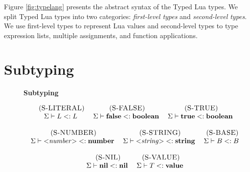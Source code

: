 Figure \ref{fig:typelang} presents the abstract syntax of the
Typed Lua types.
We split Typed Lua types into two categories:
\emph{first-level types} and \emph{second-level types}.
We use first-level types to represent Lua values and
second-level types to type expression lists, multiple assignments,
and function applications.

\section{Subtyping}

\begin{figure}[!ht]
\textbf{Subtyping}\\
\dstart
\begin{footnotesize}
$$
\begin{array}{c}
\begin{array}{c}
\mylabel{S-LITERAL}\\
\senv \vdash L \subtype L
\end{array}
\;
\begin{array}{c}
\mylabel{S-FALSE}\\
\senv \vdash \False \subtype \Boolean
\end{array}
\;
\begin{array}{c}
\mylabel{S-TRUE}\\
\senv \vdash \True \subtype \Boolean
\end{array}
\\ \\
\begin{array}{c}
\mylabel{S-NUMBER}\\
\senv \vdash {<}{\it number}{>} \subtype \Number
\end{array}
\;
\begin{array}{c}
\mylabel{S-STRING}\\
\senv \vdash {<}{\it string}{>} \subtype \String
\end{array}
\;
\begin{array}{c}
\mylabel{S-BASE}\\
\senv \vdash B \subtype B
\end{array}
\\ \\
\begin{array}{c}
\mylabel{S-NIL}\\
\senv \vdash \Nil \subtype \Nil
\end{array}
\;
\begin{array}{c}
\mylabel{S-VALUE}\\
\senv \vdash T \subtype \Value

\end{array}
\end{array}$$
\end{footnotesize}
\end{figure}
